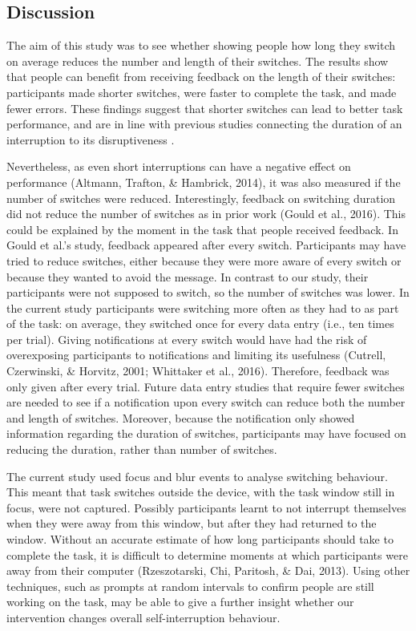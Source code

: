 \subsection{Discussion}
The aim of this study was to see whether showing people how long they switch on average reduces the number and length of their switches. The results show that people can benefit from receiving feedback on the length of their switches: participants made shorter switches, were faster to complete the task, and made fewer errors. These findings suggest that shorter switches can lead to better task performance, and are in line with previous studies connecting the duration of an interruption to its disruptiveness \citep{Altmann2017, Monk2008}.

Nevertheless, as even short interruptions can have a negative effect on performance (Altmann, Trafton, & Hambrick, 2014), it was also measured if the number of switches were reduced. Interestingly, feedback on switching duration did not reduce the number of switches as in prior work (Gould et al., 2016). This could be explained by the moment in the task that people received feedback. In Gould et al.'s study, feedback appeared after every switch. Participants may have tried to reduce switches, either because they were more aware of every switch or because they wanted to avoid the message. In contrast to our study, their participants were not supposed to switch, so the number of switches was lower. In the current study participants were switching more often as they had to as part of the task: on average, they switched once for every data entry (i.e., ten times per trial). Giving notifications at every switch would have had the risk of overexposing participants to notifications and limiting its usefulness (Cutrell, Czerwinski, & Horvitz, 2001; Whittaker et al., 2016). Therefore, feedback was only given after every trial. Future data entry studies that require fewer switches are needed to see if a notification upon every switch can reduce both the number and length of switches. Moreover, because the notification only showed information regarding the duration of switches, participants may have focused on reducing the duration, rather than number of switches. 

The current study used focus and blur events to analyse switching behaviour. This meant that task switches outside the device, with the task window still in focus, were not captured. Possibly participants learnt to not interrupt themselves when they were away from this window, but after they had returned to the window. Without an accurate estimate of how long participants should take to complete the task, it is difficult to determine moments at which participants were away from their computer (Rzeszotarski, Chi, Paritosh, & Dai, 2013).  Using other techniques, such as prompts at random intervals to confirm people are still working on the task, may be able to give a further insight whether our intervention changes overall self-interruption behaviour. 

